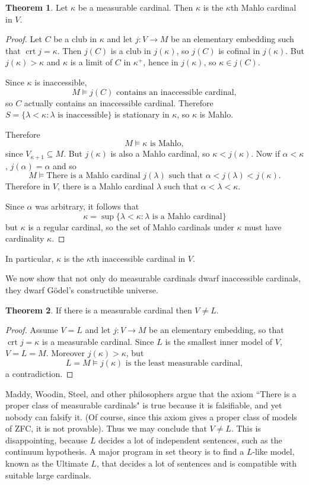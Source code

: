 \documentclass[12pt]{report}
\DeclareMathOperator{\crt}{crt}
\theoremstyle{definition}
\newtheorem{theorem}{Theorem}[chapter]
\begin{document}
\begin{theorem}
Let $\kappa$ be a measurable cardinal. Then $\kappa$ is the $\kappa$th Mahlo cardinal in $V$.
\end{theorem}
\begin{proof}
Let $C$ be a club in $\kappa$ and let $j: V \to M$ be an elementary embedding such that $\crt j = \kappa$.
Then $j(C)$ is a club in $j(\kappa)$, so $j(C)$ is cofinal in $j(\kappa)$. But $j(\kappa) > \kappa$ and $\kappa$ is a limit of $C$ in $\kappa^+$, hence in $j(\kappa)$, so $\kappa \in j(C)$.

Since $\kappa$ is inaccessible,
$$M \models \text{$j(C)$ contains an inaccessible cardinal},$$
so $C$ actually contains an inaccessible cardinal. Therefore $S = \{\lambda < \kappa: \text{$\lambda$ is inaccessible}\}$ is stationary in $\kappa$, so $\kappa$ is Mahlo.

Therefore
$$M \models \text{$\kappa$ is Mahlo},$$
since $V_{\kappa + 1} \subseteq M$. But $j(\kappa)$ is also a Mahlo cardinal, so $\kappa < j(\kappa)$. Now if $\alpha < \kappa$, $j(\alpha) = \alpha$ and so
$$M \models \text{There is a Mahlo cardinal $j(\lambda)$ such that $\alpha < j(\lambda) < j(\kappa)$}.$$
Therefore in $V$, there is a Mahlo cardinal $\lambda$ such that $\alpha < \lambda < \kappa$.

Since $\alpha$ was arbitrary, it follows that
$$\kappa = \sup \{\lambda < \kappa: \text{$\lambda$ is a Mahlo cardinal}\}$$
but $\kappa$ is a regular cardinal, so the set of Mahlo cardinals under $\kappa$ must have cardinality $\kappa$.
\end{proof}
In particular, $\kappa$ is the $\kappa$th inaccessible cardinal in $V$.

We now show that not only do measurable cardinals dwarf inaccessible cardinals, they dwarf G\"odel's constructible universe.
\begin{theorem}
If there is a measurable cardinal then $V \neq L$.
\end{theorem}
\begin{proof}
Assume $V = L$ and let $j: V \to M$ be an elementary embedding, so that $\crt j = \kappa$ is a measurable cardinal.
Since $L$ is the smallest inner model of $V$, $V = L = M$. Moreover $j(\kappa) > \kappa$, but
$$L = M \models \text{$j(\kappa)$ is the least measurable cardinal},$$
a contradiction.
\end{proof}
Maddy, Woodin, Steel, and other philosophers argue that the axiom ``There is a proper class of measurable cardinals" is true because it is falsifiable, and yet nobody can falsify it.
(Of course, since this axiom gives a proper class of models of ZFC, it is not provable). Thus we may conclude that $V \neq L$.
This is disappointing, because $L$ decides a lot of independent sentences, such as the continuum hypothesis.
A major program in set theory is to find a $L$-like model, known as the Ultimate $L$, that decides a lot of sentences and is compatible with suitable large cardinals.
\end{document}
